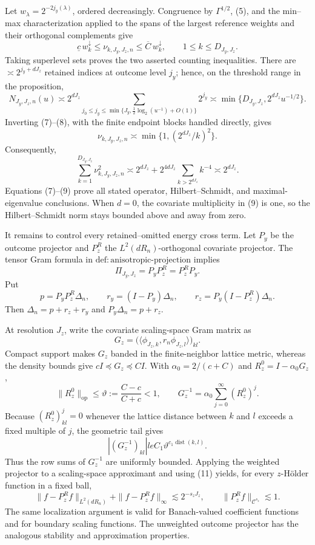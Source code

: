 Let \(w_\lambda=2^{-2j_y(\lambda)}\), ordered decreasingly.  Congruence by \(\Gamma^{1/2}\), (5), and the min--max characterization applied to the spans of the largest reference weights and their orthogonal complements give
\[
\underline c\,w_k^\downarrow\le\nu_{k,J_y,J_z,n}
\le\overline C\,w_k^\downarrow,
\qquad 1\le k\le D_{J_y,J_z}. \tag{7}
\]
Taking superlevel sets proves the two asserted counting inequalities.  There are \(\asymp2^{j_y+dJ_z}\) retained indices at outcome level \(j_y\); hence, on the threshold range in the proposition,
\[
N_{J_y,J_z,n}(u)
\asymp2^{dJ_z}\!\sum_{j_0\le j_y\le
\min\{J_y,\frac12\log_2(u^{-1})+O(1)\}}2^{j_y}
\asymp\min\{D_{J_y,J_z},2^{dJ_z}u^{-1/2}\}. \tag{8}
\]
Inverting (7)--(8), with the finite endpoint blocks handled directly, gives
\[
\nu_{k,J_y,J_z,n}\asymp\min\{1,(2^{dJ_z}/k)^2\}.
\]
Consequently,
\[
\sum_{k=1}^{D_{J_y,J_z}}\nu_{k,J_y,J_z,n}^2
\asymp2^{dJ_z}+2^{4dJ_z}\sum_{k>2^{dJ_z}}k^{-4}
\asymp2^{dJ_z}. \tag{9}
\]
Equations (7)--(9) prove all stated operator, Hilbert--Schmidt, and maximal-eigenvalue conclusions.  When \(d=0\), the covariate multiplicity in (9) is one, so the Hilbert--Schmidt norm stays bounded above and away from zero.

It remains to control every retained--omitted energy cross term.  Let \(P_y\) be the outcome projector and \(P_z^R\) the \(L^2(dR_n)\)-orthogonal covariate projector.  The tensor Gram formula in \(\mathrm{def{:}anisotropic\text{-}projection}\) implies
\[
\Pi_{J_y,J_z}=P_yP_z^R=P_z^RP_y. \tag{10}
\]
Put
\[
p=P_yP_z^R\Delta_n,
\qquad r_y=(I-P_y)\Delta_n,
\qquad r_z=P_y(I-P_z^R)\Delta_n.
\]
Then \(\Delta_n=p+r_z+r_y\) and \(P_y\Delta_n=p+r_z\).

At resolution \(J_z\), write the covariate scaling-space Gram matrix as
\[
G_z=\bigl(\langle\phi_{J_z,k},r_n\phi_{J_z,l}\rangle\bigr)_{kl}.
\]
Compact support makes \(G_z\) banded in the finite-neighbor lattice metric, whereas the density bounds give \(cI\preceq G_z\preceq CI\).  With \(\alpha_0=2/(c+C)\) and \(R_z^0=I-\alpha_0G_z\),
\[
\|R_z^0\|_{\mathrm{op}}\le\vartheta:=\frac{C-c}{C+c}<1,
\qquad
G_z^{-1}=\alpha_0\sum_{j=0}^{\infty}(R_z^0)^j.
\]
Because \((R_z^0)^j_{kl}=0\) whenever the lattice distance between \(k\) and \(l\) exceeds a fixed multiple of \(j\), the geometric tail gives
\[
|(G_z^{-1})_{kl}|le C_1\vartheta^{c_1\operatorname{dist}(k,l)}. \tag{11}
\]
Thus the row sums of \(G_z^{-1}\) are uniformly bounded.  Applying the weighted projector to a scaling-space approximant and using (11) yields, for every \(z\)-H\"older function in a fixed ball,
\[
\|f-P_z^Rf\|_{L^2(dR_n)}+\|f-P_z^Rf\|_\infty
\lesssim2^{-s_zJ_z},
\qquad
\|P_z^Rf\|_{\mathcal C^{s_z}}\lesssim1. \tag{12}
\]
The same localization argument is valid for Banach-valued coefficient functions and for boundary scaling functions.  The unweighted outcome projector has the analogous stability and approximation properties.


